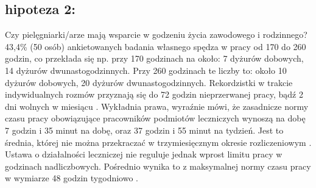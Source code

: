 \documentclass[a4paper,12pt,twoside,openright]{mwrep}
\begin{document}

\subsection*{hipoteza 2:} 

Czy  pielęgniarki/arze mają wsparcie w godzeniu życia zawodowego i rodzinnego? 
 43,4\%  (50 osób) ankietowanych badania własnego spędza w pracy od 170 do 260 godzin, co przekłada się np. przy 170 godzinach na około:  7 dyżurów dobowych, 14 dyżurów dwunastogodzinnych. Przy 260 godzinach te liczby to: około  10 dyżurów dobowych,  20 dyżurów dwunastogodzinnych. Rekordzistki w trakcie indywidualnych rozmów przyznają się do 72 godzin nieprzerwanej pracy, bądź 2 dni wolnych w miesiącu \cite{cyfrowe}.  Wykładnia prawa, wyraźnie mówi, że zasadnicze normy czasu pracy obowiązujące pracowników podmiotów leczniczych wynoszą na dobę 7 godzin i 35 minut na dobę, oraz 37 godzin i 55 minut na tydzień. Jest to średnia, której nie można przekraczać w trzymiesięcznym okresie rozliczeniowym \cite{okres}. Ustawa o działalności leczniczej nie reguluje  jednak wprost limitu pracy w godzinach nadliczbowych. Pośrednio wynika to z maksymalnej normy czasu pracy w wymiarze 48 godzin tygodniowo \cite{klauzula}.
\end{document}
